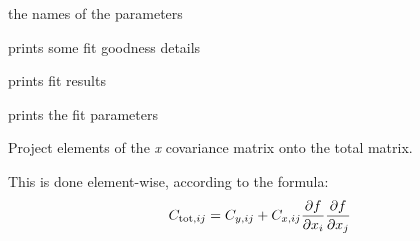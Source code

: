 \documentclass[a4paper,10pt,english]{sphinxmanual}
\begin{document}
\begin{fulllineitems}

\begin{fulllineitems}
\label{index:kafe.fit.Fit.parameter_names}
the names of the parameters

\end{fulllineitems}


\begin{fulllineitems}
\label{index:kafe.fit.Fit.print_fit_details}
prints some fit goodness details

\end{fulllineitems}


\begin{fulllineitems}
\label{index:kafe.fit.Fit.print_fit_results}
prints fit results

\end{fulllineitems}


\begin{fulllineitems}
\label{index:kafe.fit.Fit.print_rounded_fit_parameters}
prints the fit parameters

\end{fulllineitems}


\begin{fulllineitems}
\label{index:kafe.fit.Fit.project_x_covariance_matrix}
Project elements of the \emph{x} covariance matrix onto the total
matrix.

This is done element-wise, according to the formula:
\begin{gather}
\begin{split}C_{\text{tot}, ij} = C_{y, ij} + C_{x, ij}
\frac{\partial f}{\partial x_i}  \frac{\partial f}{\partial x_j}\end{split}\notag
\end{gather}
\end{fulllineitems}


\end{fulllineitems}
\end{document}
